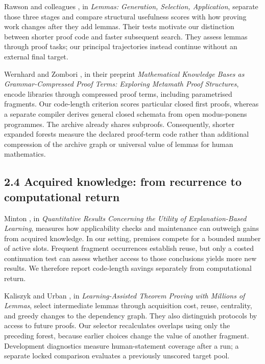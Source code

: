 \documentclass[pdflatex,sn-basic,Numbered]{sn-jnl}
\begin{document}
Rawson and colleagues \citep{RawsonEtAl2023}, in \emph{Lemmas: Generation, Selection, Application}, separate those three stages and compare structural usefulness scores with how proving work changes after they add lemmas. Their tests motivate our distinction between shorter proof code and faster subsequent search. They assess lemmas through proof tasks; our principal trajectories instead continue without an external final target.

Wernhard and Zombori \citep{WernhardZombori2025}, in their preprint \emph{Mathematical Knowledge Bases as Grammar-Compressed Proof Terms: Exploring Metamath Proof Structures}, encode libraries through compressed proof terms, including parametrised fragments. Our code-length criterion scores particular closed first proofs, whereas a separate compiler derives general closed schemata from open modus-ponens programmes. The archive already shares subproofs. Consequently, shorter expanded forests measure the declared proof-term code rather than additional compression of the archive graph or universal value of lemmas for human mathematics.

\subsection*{2.4 Acquired knowledge: from recurrence to computational return}\label{acquired-knowledge-from-recurrence-to-computational-return}

Minton \citep{Minton1990Utility}, in \emph{Quantitative Results Concerning the Utility of Explanation-Based Learning}, measures how applicability checks and maintenance can outweigh gains from acquired knowledge. In our setting, premises compete for a bounded number of active slots. Frequent fragment occurrences establish reuse, but only a costed continuation test can assess whether access to those conclusions yields more new results. We therefore report code-length savings separately from computational return.

Kaliszyk and Urban \citep{KaliszykUrban2015}, in \emph{Learning-Assisted Theorem Proving with Millions of Lemmas}, select intermediate lemmas through acquisition cost, reuse, centrality, and greedy changes to the dependency graph. They also distinguish protocols by access to future proofs. Our selector recalculates overlaps using only the preceding forest, because earlier choices change the value of another fragment. Development diagnostics measure human-statement coverage after a run; a separate locked comparison evaluates a previously unscored target pool.
\end{document}
